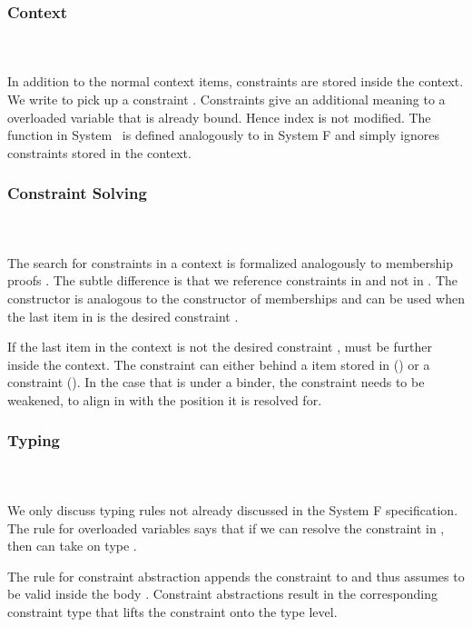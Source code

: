 \subsubsection{Context}\hfill\\\\
In addition to the normal context items, constraints are stored inside the context.
\FoCtx
We write    to pick up a constraint . 
Constraints give an additional meaning to a overloaded variable that is already bound. Hence index  is not modified. The  function in System \Fo\ is defined analogously to  in System F and simply ignores constraints stored in the context.

\subsubsection{Constraint Solving}\hfill\\\\
The search for constraints in a context is formalized analogously to membership proofs   . The subtle difference is that we reference constraints in  and not in . 
\FoCstrSolve
The  constructor is analogous to the  constructor of memberships and can be used when the last item in  is the desired constraint .

\noindent If the last item in the context is not the desired constraint ,  must be further inside the context. The constraint can either behind a item stored in  () or a constraint (). In the case that  is under a binder, the constraint needs to be weakened, to align in  with the position it is resolved for. 

\subsubsection{Typing}\hfill\\\\
We only discuss typing rules not already discussed in the System F specification. 
\FoTyping
The rule for overloaded variables  says that if we can resolve the constraint  \Constr{:}  in , then  can take on type . 

\noindent The rule for constraint abstraction  appends the constraint  to  and thus assumes  to be valid inside the body . Constraint abstractions result in the corresponding constraint type \Constr{[}  \Constr{]⇒}  that lifts the constraint onto the type level.


